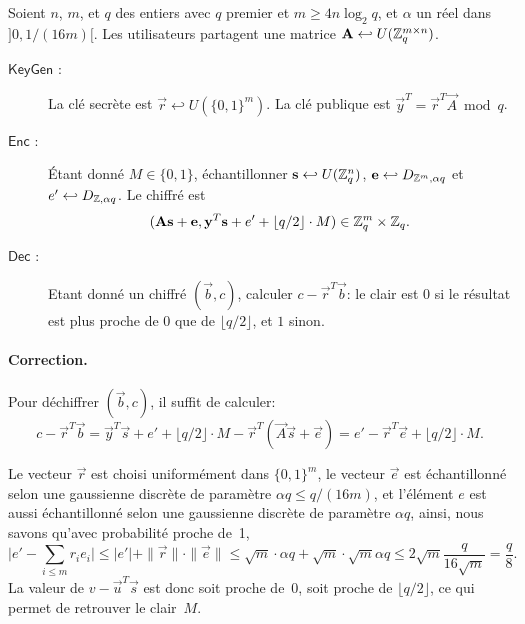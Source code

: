 \begin{definition} 
Soient $n$, $m$, et $q$ des entiers avec $q$ premier et $m \geq 4 n  \log_2 q$, 
et $\alpha$ un réel dans~$]0,1/(16m)[$. Les utilisateurs partagent une matrice $\mathbf{A} \hookleftarrow U(\mathbb{Z}_q^{m\times n})$.

\begin{description}
\item[$\mathsf{KeyGen}$ :]
La clé secrète est $\vec{r} \hookleftarrow U(\{0,1\}^m)$. La clé publique est $\vec{y}^T =  \vec{r}^T \vec{A} \bmod q$.

\item[$\mathsf{Enc}$ :]
\'Etant donné $M \in \{0,1 \}$, échantillonner $\mathbf{s} \hookleftarrow U (\mathbb{Z}_q^n)$, $\mathbf{e} \hookleftarrow D_{\mathbb{Z}^m, \alpha q}$ et 
$e' \hookleftarrow D_{\mathbb{Z}, \alpha q}$. Le chiffré est $$(\mathbf{A}\mathbf{s}+\mathbf{e},\mathbf{y}^T \mathbf{s} + e' + \lfloor q/2 \rfloor \cdot M) \in \mathbb{Z}_q^{m} \times \mathbb{Z}_q.$$

\item[$\mathsf{Dec}$ :] 
Etant donné un chiffré $(\vec{b},c)$, calculer $c - \vec{r}^T \vec{b}$: le clair est $0$ si le résultat est plus proche de $0$ que de $\lfloor q/2 \rfloor$, et $1$ sinon.

\end{description}
\end{definition}

\paragraph{Correction.}
Pour déchiffrer $(\vec{b},c)$, il suffit de calculer:
\[
c - \vec{r}^T \vec{b} = \vec{y}^T \vec{s} + e' + \lfloor q/2 \rfloor \cdot M - \vec{r}^T (\vec{A} \vec{s} + \vec{e} ) 
= e'-\vec{r}^T \vec{e} + \lfloor q/2 \rfloor \cdot M.
\]

Le vecteur $\vec{r}$ est choisi uniformément dans $\{0,1 \}^m$, 
le vecteur $\vec{e}$ est échantillonné selon une gaussienne discrète de paramètre $\alpha q \leq q/(16m)$, et l'élément $e$ est aussi échantillonné selon une gaussienne discrète de paramètre $\alpha q$, ainsi, nous savons qu'avec probabilité proche de~1, 
\[ 
\big| e' - \sum_{i \leq m} r_i e_i \big| \leq |e'| + \|\vec{r}\| \cdot \|\vec{e}\| \leq  \sqrt{m} \cdot \alpha q + \sqrt{m} \cdot \sqrt{m} \alpha q \leq 2 \sqrt{m} \frac{q}{16\sqrt{m}} = \frac{q}{8}.
\]
La valeur de $v - \vec{u}^T \vec{s}$ est donc soit proche de~$0$, soit proche de $\lfloor q/2 \rfloor$, ce qui permet de 
retrouver le clair~$M$.

